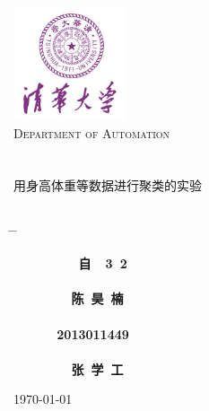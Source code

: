 


\begin{titlepage}
\begin{center}
\includegraphics[width=0.25\textwidth]{resource/logo.jpg}\\[1cm]
\textsc{\LARGE Department of Automation}\\[1.5cm]
\\[0.5cm]
\hrulefill
\\[0.8cm]{\centering \huge \hei 用身高体重等数据进行聚类的实验}\\[0.4cm]
\hrulefill
\\[4cm]

\begin{tabbing}       %

 \hspace*{5cm} \= \hspace{2.6cm} \= \kill

\>  {\centering\fs\sihao\textbf{~~~~~~~~~自~~3~2}} \\
\\
\>  {\centering\fs\sihao\textbf{~~~~~~~~陈~昊~楠}}\\
\\
\>  {\centering\fs\sihao\textbf{~~~~~~2013011449}}\\
\\
\>  {\centering\fs\sihao\textbf{~~~~~~~~张~学~工}} \\

\end{tabbing}
\vfill
{\large \today}
\end{center}
\end{titlepage}

